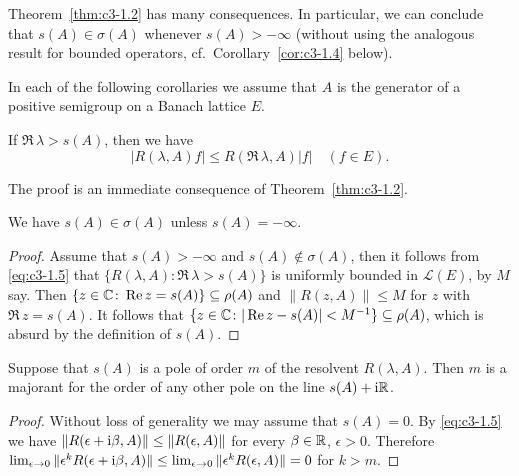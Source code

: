 Theorem~\ref{thm:c3-1.2} has many consequences.
In particular, we can conclude that $s(A) \in \sigma(A)$ whenever $s(A) > -\infty$ (without using the analogous result for bounded operators, cf.\ Corollary~\ref{cor:c3-1.4} below).

In each of the following corollaries we assume that $A$ is the generator of a positive semigroup on a Banach lattice $E$.

\begin{corollary}\label{cor:c3-1.3}
If $\Re\, \lambda > s(A)$, then we have
\begin{equation}\label{eq:c3-1.5}
	|R(\lambda,A)f| \leq R(\Re\,\lambda,A) |f| \quad (f \in E).
\end{equation}
\end{corollary}

The proof is an immediate consequence of Theorem~\ref{thm:c3-1.2}.

\begin{corollary}\label{cor:c3-1.4}
We have $s(A) \in \sigma(A)$ unless $s(A) = -\infty$.
\end{corollary}

\begin{proof}
Assume that $s(A) > -\infty$ and $s(A) \notin \sigma(A)$, then it follows from \eqref{eq:c3-1.5} that $\{R(\lambda,A) \colon \Re\,\lambda > s(A)\}$ is uniformly bounded in $\mathcal{L}(E)$,
%
by $M$ say. Then $\{z \in \mathbb{C}  \colon \mathop{}\!\mathrm{Re}\, z = s(A)\} \subseteq \rho(A)$ and $\|R(z,A)\| \leq M$ for $z$ with $\Re\, z = s(A)$. It follows that $\{z \in \mathbb{C}  \colon |\mathop{}\!\mathrm{Re}\, z - s(A)| < M^{-1}\} \subseteq \rho(A)$, which is absurd by the definition of $s(A)$.
\end{proof}

\begin{corollary}\label{cor:c3-1.5}
Suppose that $s(A)$ is a pole of order $m$ of the resolvent $R(\lambda,A)$.
Then $m$ is a majorant for the order of any other pole on the line $s(A) + \mathrm{i}\mathbb{R} $.
\end{corollary}

\begin{proof}
Without loss of generality we may assume that $s(A) = 0$.
By \eqref{eq:c3-1.5} we have $\|R(\epsilon+\mathrm{i}\beta ,A)\| \leq \|R(\epsilon,A)\|$ for every $\beta \in \mathbb{R} $, $\epsilon > 0$.
Therefore $\lim_{\epsilon\to 0}\|\epsilon^k R(\epsilon+\mathrm{i}\beta ,A)\| \leq \lim_{\epsilon\to 0}\|\epsilon^k R(\epsilon,A)\| = 0$ for $k > m$.
\end{proof}

